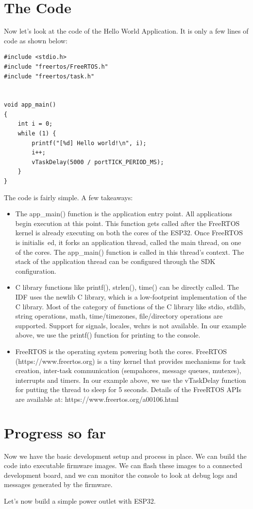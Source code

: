 \documentclass[main.tex]{subfiles}
\begin{document}
\section{The Code}
Now let's look at the code of the Hello World Application. It is only a few lines of code as shown below:
\begin{verbatim}
#include <stdio.h>
#include "freertos/FreeRTOS.h"
#include "freertos/task.h"


void app_main()
{
    int i = 0;
    while (1) {
        printf("[%d] Hello world!\n", i);
        i++;
        vTaskDelay(5000 / portTICK_PERIOD_MS);
    }
}
\end{verbatim}
The code is fairly simple. A few takeaways:
\begin{itemize}
\item The app\_main() function is the application entry point. All applications begin execution at this point. This function gets called after the FreeRTOS kernel is already executing on both the cores of the ESP32. Once FreeRTOS is initialis\
ed, it forks an application thread, called the main thread, on one of the cores. The app\_main() function is called in this thread's context. The stack of the application thread can be configured through the SDK configuration.
\item C library functions like printf(), strlen(), time() can be directly called. The IDF uses the newlib C library, which is a low-footprint implementation of the C library. Most of the category of functions of the C library like stdio, stdlib, string operations, math, time/timezones, file/directory operations are supported. Support for signals, locales, wchrs is not available. In our example above, we use the printf() function for printing to the console.
\item FreeRTOS is the operating system powering both the cores. FreeRTOS (https://www.freertos.org) is a tiny kernel that provides mechanisms for task creation, inter-task communication (sempahores, message queues, mutexes), interrupts and timers. In our example above, we use the vTaskDelay function for putting the thread to sleep for 5 seconds. Details of the FreeRTOS APIs are available at: https://www.freertos.org/a00106.html
\end{itemize}

\section{Progress so far}
Now we have the basic development setup and process in place. We can build the code into executable firmware images. We can flash these images to a connected development board, and we can monitor the console to look at debug logs and messages generated by the firmware. 

Let's now build a simple power outlet with ESP32.
\end{document}
